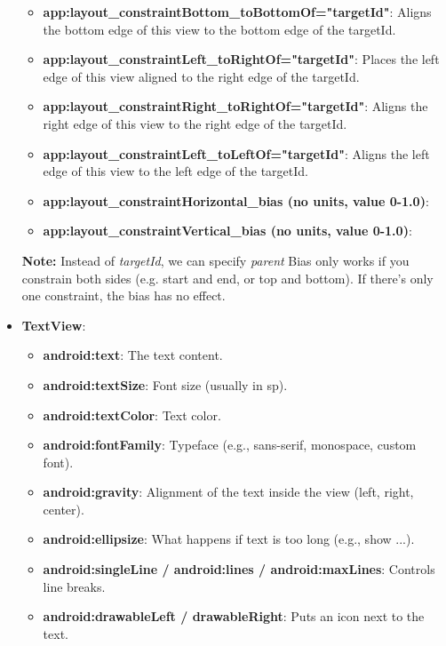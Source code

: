 \documentclass{report}
\begin{document}
\begin{itemize}
\begin{itemize}
                \item \textbf{app:layout\_constraintBottom\_toBottomOf="targetId"}: Aligns the bottom edge of this view to the bottom edge of the targetId.
                \item \textbf{app:layout\_constraintLeft\_toRightOf="targetId"}: Places the left edge of this view aligned to the right edge of the targetId.
                \item \textbf{app:layout\_constraintRight\_toRightOf="targetId"}: Aligns the right edge of this view to the right edge of the targetId.
                \item \textbf{app:layout\_constraintLeft\_toLeftOf="targetId"}: Aligns the left edge of this view to the left edge of the targetId.
                \item \textbf{app:layout\_constraintHorizontal\_bias (no units, value 0-1.0)}:
                \item \textbf{app:layout\_constraintVertical\_bias (no units, value 0-1.0)}:
            \end{itemize}
            \textbf{Note:} Instead of \textit{targetId}, we can specify \textit{parent}
            \bigbreak \noindent 
            Bias only works if you constrain both sides (e.g. start and end, or top and bottom). If there’s only one constraint, the bias has no effect.
        \item \textbf{TextView}: 
            \begin{itemize}
                \item \textbf{android:text}:  The text content.
                \item \textbf{android:textSize}:  Font size (usually in sp).
                \item \textbf{android:textColor}:  Text color.
                \item \textbf{android:fontFamily}:  Typeface (e.g., sans-serif, monospace, custom font).
                \item \textbf{android:gravity}:  Alignment of the text inside the view (left, right, center).
                \item \textbf{android:ellipsize}:  What happens if text is too long (e.g., show ...).
                \item \textbf{android:singleLine / android:lines / android:maxLines}:  Controls line breaks.
                \item \textbf{android:drawableLeft / drawableRight}:  Puts an icon next to the text.
            \end{itemize}

\end{itemize}
\end{document}
